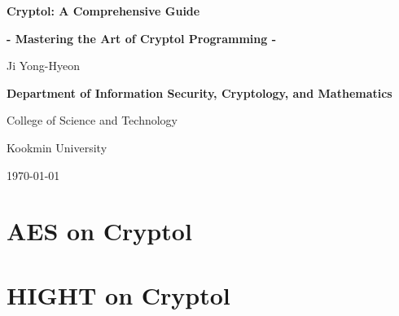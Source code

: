 \documentclass[12pt,openany]{book}
\begin{document}
	
	\begin{titlepage}
		\begin{center}
			{\Huge\textsf{\textbf{Cryptol: A Comprehensive Guide}}\par}
			{\Large\textsf{\textbf{- Mastering the Art of Cryptol Programming -}}\par}
			\vspace{0.5in}
			{\Large {Ji Yong-Hyeon}\par}
			\vspace{1in}
			\vspace{1in}
			{\large\bf \textsf{Department of Information Security, Cryptology, and Mathematics}\par}
			{\textsf{College of Science and Technology}\par}
			{\textsf{Kookmin University}\par}
			\vspace{.25in}
			{\large \textsf{\today}\par}
		\end{center}
	\end{titlepage}
	
	\frontmatter
	
%	
	
	\newpage
	\tableofcontents
	
	\newpage
	\mainmatter
	
	\chapter{AES on Cryptol}
	
	\chapter{HIGHT on Cryptol}
	
%	
%	
	
	\appendix
%	
%	
%	
	
	\backmatter
	
	
\end{document}
